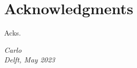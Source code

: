\chapter*{Acknowledgments}

Acks.

\begin{flushright}
{\itshape
Carlo \\
Delft, May 2023
}
\end{flushright}
